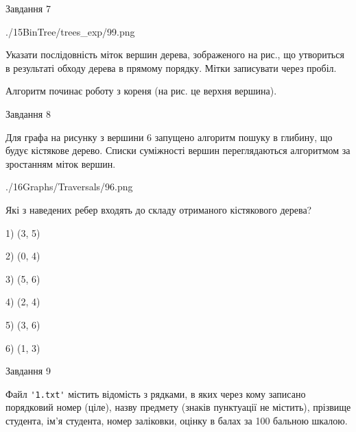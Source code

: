 \documentclass[12pt, ukrainian]{article}
\def\code#1{\Verb!#1!}
\begin{document}
{\vspace{10mm}\par

\newpage
\begin{minipage}[t]{9.7cm}
               
{\begin{center}Завдання {7}\end{center}}
\vspace{-6mm}

\begin{center}
	{./15BinTree/trees_exp/99.png}
\end{center}
Указати послідовність міток вершин дерева, зображеного на рис., що утвориться в результаті обходу дерева в прямому порядку. Мітки записувати через пробіл.\par Алгоритм починає роботу з кореня (на рис. це верхня вершина).\par

\end{minipage}
\vline \hspace{8mm}
\begin{minipage}[t]{8.0cm}
               
{\begin{center}Завдання {8}\end{center}}
\vspace{-6mm}
Для графа на рисунку з вершини 6 запущено алгоритм пошуку в глибину, що будує кістякове дерево. Списки суміжності вершин переглядаються алгоритмом за зростанням міток вершин.\par
\begin{center}
	{./16Graphs/Traversals/96.png}
\end{center}
\par Які з наведених ребер входять до складу отриманого кістякового дерева?\par
1) (3, 5)\par
2) (0, 4)\par
3) (5, 6)\par
4) (2, 4)\par
5) (3, 6)\par
6) (1, 3)\par
{\vskip 15pt} \par

\end{minipage}

               
{\begin{center}Завдання {9}\end{center}}
\vspace{-6mm}
Файл \code{'1.txt'} містить відомість з рядками, в яких через кому записано поряд\-ковий номер (ціле), назву предмету (знаків пунктуації не містить), прізвище студента, ім'я студента, номер заліковки, оцінку в балах за 100 бальною шкалою.

}
\end{document}

